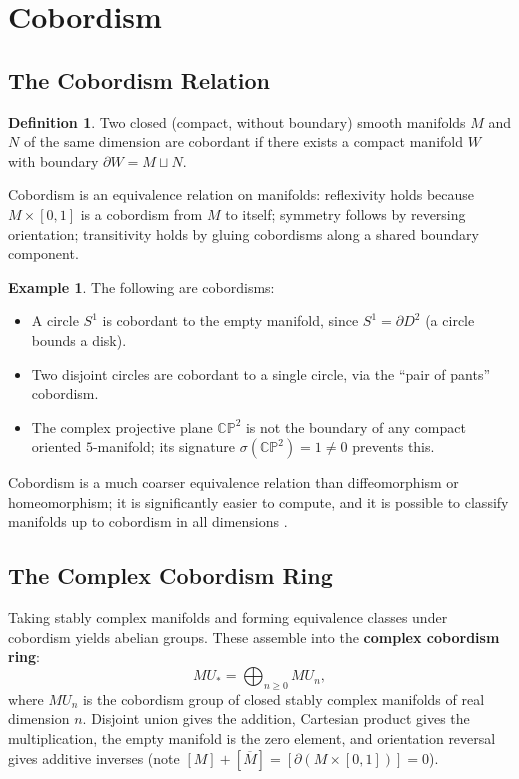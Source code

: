 \documentclass[12pt]{article}
\theoremstyle{definition}
\newtheorem{definition}[theorem]{Definition}
\newtheorem{example}[theorem]{Example}
\theoremstyle{remark}
\newcommand{\CP}{\mathbb{CP}}
\newcommand{\MU}{MU_*}
\begin{document}
\section{Cobordism}\label{sec:cobordism}

\subsection{The Cobordism Relation}

\begin{definition}
Two closed (compact, without boundary) smooth manifolds $M$ and $N$ of the same dimension are cobordant if there exists a compact manifold $W$ with boundary $\partial W = M \sqcup N$.
\end{definition}

Cobordism is an equivalence relation on manifolds: reflexivity holds because $M \times [0,1]$ is a cobordism from $M$ to itself; symmetry follows by reversing orientation; transitivity holds by gluing cobordisms along a shared boundary component.

\begin{example}
The following are cobordisms:
\begin{itemize}
  \item A circle $S^1$ is cobordant to the empty manifold, since $S^1 = \partial D^2$ (a circle bounds a disk).
  \item Two disjoint circles are cobordant to a single circle, via the ``pair of pants'' cobordism.
  \item The complex projective plane $\CP^2$ is not the boundary of any compact oriented $5$-manifold; its signature $\sigma(\CP^2) = 1 \neq 0$ prevents this.
\end{itemize}
\end{example}

Cobordism is a much coarser equivalence relation than diffeomorphism or homeomorphism; it is significantly easier to compute, and it is possible to classify manifolds up to cobordism in all dimensions \cite{WCob25}.

\subsection{The Complex Cobordism Ring}

Taking stably complex manifolds and forming equivalence classes under cobordism yields abelian groups. These assemble into the \textbf{complex cobordism ring}:
\[
  \MU = \bigoplus_{n \geq 0} MU_n,
\]
where $MU_n$ is the cobordism group of closed stably complex manifolds of real dimension $n$. Disjoint union gives the addition, Cartesian product gives the multiplication, the empty manifold is the zero element, and orientation reversal gives additive inverses (note $[M] + [\overline{M}] = [\partial(M \times [0,1])] = 0$).
\end{document}
